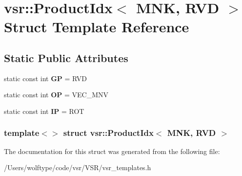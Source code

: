 \hypertarget{structvsr_1_1_product_idx_3_01_m_n_k_00_01_r_v_d_01_4}{\section{vsr\-:\-:Product\-Idx$<$ M\-N\-K, R\-V\-D $>$ Struct Template Reference}
\label{structvsr_1_1_product_idx_3_01_m_n_k_00_01_r_v_d_01_4}
}
\subsection*{Static Public Attributes}
\begin{DoxyCompactItemize}
\item 
\hypertarget{structvsr_1_1_product_idx_3_01_m_n_k_00_01_r_v_d_01_4_a3b9bf50160d283af98e5b28fa2baac39}{static const int {\bfseries G\-P} = R\-V\-D}\label{structvsr_1_1_product_idx_3_01_m_n_k_00_01_r_v_d_01_4_a3b9bf50160d283af98e5b28fa2baac39}

\item 
\hypertarget{structvsr_1_1_product_idx_3_01_m_n_k_00_01_r_v_d_01_4_a9c053d916c9ca91f27ec1d8ddf45d994}{static const int {\bfseries O\-P} = V\-E\-C\-\_\-\-M\-N\-V}\label{structvsr_1_1_product_idx_3_01_m_n_k_00_01_r_v_d_01_4_a9c053d916c9ca91f27ec1d8ddf45d994}

\item 
\hypertarget{structvsr_1_1_product_idx_3_01_m_n_k_00_01_r_v_d_01_4_a94525eaaed1ae4c0bdf1dfe66ac586f2}{static const int {\bfseries I\-P} = R\-O\-T}\label{structvsr_1_1_product_idx_3_01_m_n_k_00_01_r_v_d_01_4_a94525eaaed1ae4c0bdf1dfe66ac586f2}

\end{DoxyCompactItemize}
\subsubsection*{template$<$$>$ struct vsr\-::\-Product\-Idx$<$ M\-N\-K, R\-V\-D $>$}



The documentation for this struct was generated from the following file\-:\begin{DoxyCompactItemize}
\item 
/\-Users/wolftype/code/vsr/\-V\-S\-R/vsr\-\_\-templates.\-h\end{DoxyCompactItemize}
